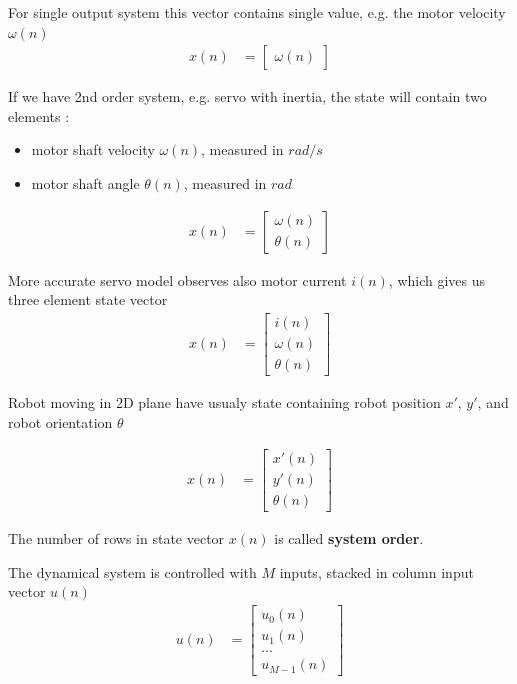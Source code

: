 \documentclass[12pt,twoside,onecolumn,openany,extrafontsizes,dvipsnames]{memoir}
\begin{document}
        For single output system this vector contains single value, e.g. the motor velocity $\omega(n)$
        \begin{align}
            x(n) &= \begin{bmatrix} \omega(n) \end{bmatrix}
        \end{align}


        If we have 2nd order system, e.g. servo with inertia, the state will contain two 
        elements : 
        \begin{itemize}
            \item motor shaft velocity $\omega(n)$, measured in $rad/s$
            \item motor shaft angle $\theta(n)$, measured in $rad$
        \end{itemize}

        \begin{align}
            x(n) &= \begin{bmatrix} \omega(n) \\ \theta(n) \end{bmatrix}
        \end{align}

        More accurate servo model observes also motor current $i(n)$, which gives us three element state vector
        \begin{align}
            x(n) &= \begin{bmatrix} i(n) \\ \omega(n) \\ \theta(n) \end{bmatrix}
        \end{align}

        Robot moving in 2D plane have usualy state containing robot position $x'$, $y'$, and robot orientation $\theta$

        \begin{align}
            x(n) &= \begin{bmatrix} x'(n) \\ y'(n) \\ \theta(n) \end{bmatrix}
        \end{align}

        The number of rows in state vector $x(n)$ is called \textbf{system order}.

        The dynamical system is controlled with $M$ inputs, stacked in column input vector $u(n)$
        \begin{align}
            u(n) &= \begin{bmatrix} u_{0}(n) \\ u_{1}(n) \\ ... \\ u_{M-1}(n) \end{bmatrix}
        \end{align}
\end{document}
